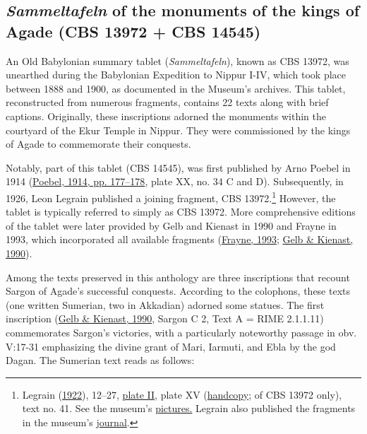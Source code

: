 \documentclass[
]{book}
\begin{document}
\hypertarget{sammeltafeln-of-the-monuments-of-the-kings-of-agade-cbs-13972-cbs-14545}{%
\subsection{\texorpdfstring{\emph{Sammeltafeln} of the monuments of the kings of Agade (CBS 13972 + CBS 14545)}{Sammeltafeln of the monuments of the kings of Agade (CBS 13972 + CBS 14545)}}\label{sammeltafeln-of-the-monuments-of-the-kings-of-agade-cbs-13972-cbs-14545}}

An Old Babylonian summary tablet (\emph{Sammeltafeln}), known as CBS 13972, was unearthed during the Babylonian Expedition to Nippur I-IV, which took place between 1888 and 1900, as documented in the Museum's archives. This tablet, reconstructed from numerous fragments, contains 22 texts along with brief captions. Originally, these inscriptions adorned the monuments within the courtyard of the Ekur Temple in Nippur. They were commissioned by the kings of Agade to commemorate their conquests.

Notably, part of this tablet (CBS 14545), was first published by Arno Poebel in 1914 (\protect\hyperlink{ref-Poebel1914}{Poebel, 1914, pp. 177--178}, plate XX, no. 34 C and D). Subsequently, in 1926, Leon Legrain published a joining fragment, CBS 13972.\footnote{Legrain (\protect\hyperlink{ref-Legrain1922}{1922}), 12--27, \href{https://archive.org/details/royalinscription00legr_0/page/55/mode/1up?view=theater}{plate II}, plate XV (\href{https://archive.org/details/royalinscription00legr_0/page/82/mode/1up}{handcopy}; of CBS 13972 only), text no. 41. See the museum's \href{https://www.penn.museum/collections/object_images.php?irn=347461}{pictures.} Legrain also published the fragments in the museum's \href{https://www.penn.museum/sites/journal/9818/}{journal}.} However, the tablet is typically referred to simply as CBS 13972. More comprehensive editions of the tablet were later provided by Gelb and Kienast in 1990 and Frayne in 1993, which incorporated all available fragments (\protect\hyperlink{ref-Frayne1993}{Frayne, 1993}; \protect\hyperlink{ref-GelbKienast1990}{Gelb \& Kienast, 1990}).

Among the texts preserved in this anthology are three inscriptions that recount Sargon of Agade's successful conquests. According to the colophons, these texts (one written Sumerian, two in Akkadian) adorned some statues. The first inscription (\protect\hyperlink{ref-GelbKienast1990}{Gelb \& Kienast, 1990}, Sargon C 2, Text A = RIME 2.1.1.11) commemorates Sargon's victories, with a particularly noteworthy passage in obv. V:17-31 emphasizing the divine grant of Mari, Iarmuti, and Ebla by the god Dagan. The Sumerian text reads as follows:
\end{document}
